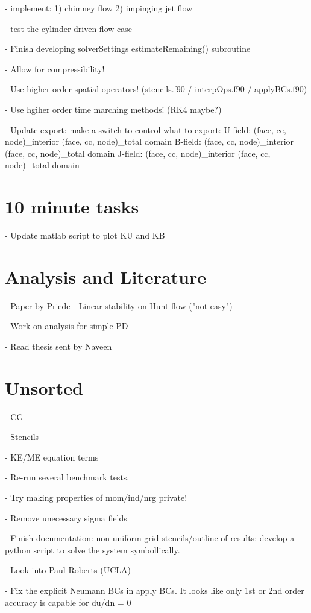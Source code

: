 \documentclass[11pt]{article}
\begin{document}
- implement: 1) chimney flow 2) impinging jet flow

- test the cylinder driven flow case

- Finish developing solverSettings estimateRemaining() subroutine

- Allow for compressibility!

- Use higher order spatial operators! (stencils.f90 / interpOps.f90 / applyBCs.f90)

- Use hgiher order time marching methods! (RK4 maybe?)

- Update export: make a switch to control what to export:
      U-field: (face, cc, node)\_interior (face, cc, node)\_total domain
      B-field: (face, cc, node)\_interior (face, cc, node)\_total domain
      J-field: (face, cc, node)\_interior (face, cc, node)\_total domain

\section{10 minute tasks}
- Update matlab script to plot KU and KB


\section{Analysis and Literature}
- Paper by Priede - Linear stability on Hunt flow ("not easy")

- Work on analysis for simple PD

- Read thesis sent by Naveen

\section{Unsorted}

- CG

- Stencils

- KE/ME equation terms

- Re-run several benchmark tests.

- Try making properties of mom/ind/nrg private!

- Remove unecessary sigma fields

- Finish documentation: non-uniform grid stencils/outline of results: develop a python script to solve the system symbollically.

- Look into Paul Roberts (UCLA)

- Fix the explicit Neumann BCs in apply BCs. It looks like only 1st or 2nd order accuracy is capable for du/dn = 0
\end{document}

